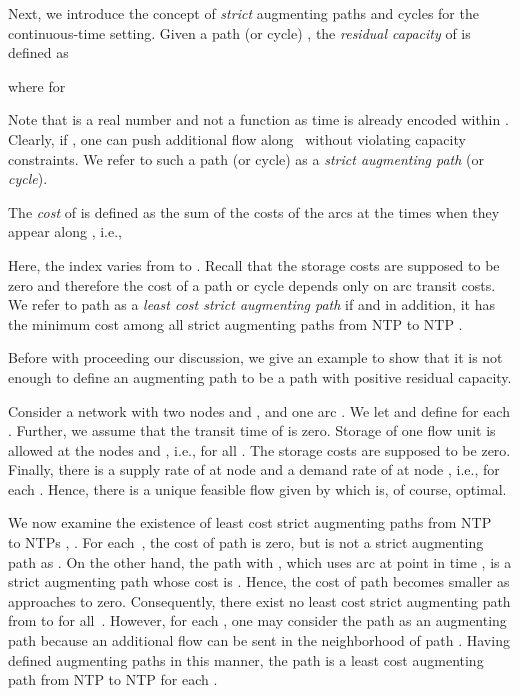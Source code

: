 \documentclass{svjour3}                     \smartqed
\begin{document}
Next, we introduce the concept of \emph{strict} augmenting paths and cycles for the continuous-time setting. Given a path (or cycle) , the \emph{residual capacity}
of  is defined as

where for 

Note that  is a real number and not a function as time is already encoded within . Clearly, if , one can push additional flow along~ without violating capacity constraints. We refer to such a path (or cycle) as a \emph{strict augmenting path} (or \emph{cycle}).










The \emph{cost} of  is defined as the sum of the costs of the arcs at the times when they appear along , i.e.,

Here, the index  varies from  to . Recall that the storage costs are supposed to be zero and therefore the cost of a path or cycle depends only on arc transit costs.  We refer to path  as a \emph{least cost strict augmenting path} if  and in addition, it has the minimum cost among all strict augmenting paths from NTP  to NTP .

Before with proceeding our discussion, we give an example to show that it is not enough to define an augmenting path to be a path with positive residual capacity.

\begin{example}\label{ex:noLCsAPath}
 Consider a network with two nodes  and , and one arc .  We let  and define  for each . Further, we assume that the transit time of  is zero. Storage of one flow unit is allowed at the nodes  and , i.e.,  for all . The storage costs are supposed to be zero. Finally, there is a supply rate of  at node  and a demand rate of  at node , i.e.,  for each . Hence, there is a unique feasible flow  given by  which is, of course, optimal.

We now examine the existence of least cost strict augmenting paths from NTP~ to NTPs , . For each~, the cost of path  is zero, but  is not a strict augmenting path as . On the other hand, the path  with , which uses arc  at point in time , is a strict augmenting path whose cost is . Hence,  the cost of path  becomes smaller as  approaches to zero. Consequently, there exist no least cost strict augmenting path from  to  for all~. However, for each , one may consider the path  as an augmenting path because an additional flow can be sent in the neighborhood of path . Having defined augmenting paths in this manner,  the path  is a least cost augmenting path from NTP  to NTP  for each .
\end{example}
\end{document}
